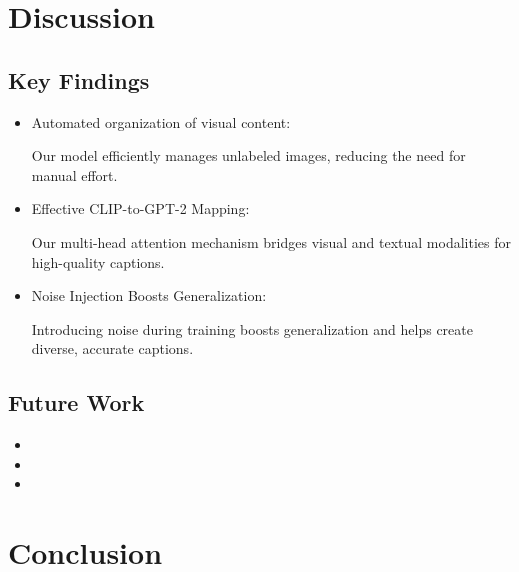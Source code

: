 \documentclass[11pt]{article}
\begin{document}
\section{Discussion}

\subsection{Key Findings}
\begin{itemize}
  \item Automated organization of visual content: 
  
  Our model efficiently manages unlabeled images, reducing the need for manual effort.  
  \item Effective CLIP-to-GPT-2 Mapping:
  
  Our multi-head attention mechanism bridges visual and textual modalities for high-quality captions.
  \item Noise Injection Boosts Generalization:
  
  Introducing noise during training boosts generalization and helps create diverse, accurate captions.
\end{itemize}

\subsection{Future Work}
\begin{itemize}
  \item 
  \item 
  \item 
\end{itemize}

\section{Conclusion}
\end{document}
